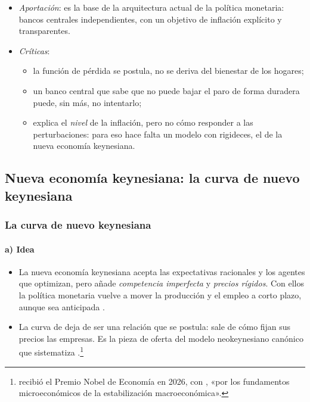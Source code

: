 \documentclass[11pt]{article}
\begin{document}
\begin{itemize}
\item \emph{Aportación}: es la base de la arquitectura actual de la política monetaria: bancos centrales independientes, con un objetivo de inflación explícito y transparentes.
\item \emph{Críticas}:
  \begin{itemize}
  \item la función de pérdida se postula, no se deriva del bienestar de los hogares;
  \item un banco central que sabe que no puede bajar el paro de forma duradera puede, sin más, no intentarlo\nocite{McCallum1995Two};
  \item explica el \emph{nivel} de la inflación, pero no cómo responder a las perturbaciones: para eso hace falta un modelo con rigideces, el de la nueva economía keynesiana.
  \end{itemize}
\end{itemize}

\subsection{Nueva economía keynesiana: la curva de \cortetitulo{} nuevo keynesiana}\label{sec:nek-phillips}

\subsubsection{La curva de  nuevo keynesiana}\label{sec:nkpc}

\paragraph{a) Idea}

\begin{itemize}
\item La nueva economía keynesiana acepta las expectativas racionales y los agentes que optimizan, pero añade \emph{competencia imperfecta} y \emph{precios rígidos}. Con ellos la política monetaria vuelve a mover la producción y el empleo a corto plazo, aunque sea anticipada .
\item La curva de  deja de ser una relación que se postula: sale de cómo fijan sus precios las empresas. Es la pieza de oferta del modelo neokeynesiano canónico que sistematiza \textcite{Woodford2003Interest}.\footnote{ recibió el Premio Nobel de Economía en 2026, con , «por los fundamentos microeconómicos de la estabilización macroeconómica»\nocite{Nobel2026Prensa}.}
\end{itemize}
\end{document}
